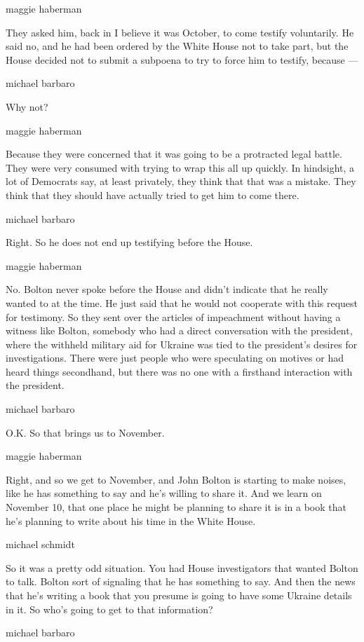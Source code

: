 maggie haberman

They asked him, back in I believe it was October, to come testify
voluntarily. He said no, and he had been ordered by the White House not
to take part, but the House decided not to submit a subpoena to try to
force him to testify, because ---

michael barbaro

Why not?

maggie haberman

Because they were concerned that it was going to be a protracted legal
battle. They were very consumed with trying to wrap this all up quickly.
In hindsight, a lot of Democrats say, at least privately, they think
that that was a mistake. They think that they should have actually tried
to get him to come there.

michael barbaro

Right. So he does not end up testifying before the House.

maggie haberman

No. Bolton never spoke before the House and didn't indicate that he
really wanted to at the time. He just said that he would not cooperate
with this request for testimony. So they sent over the articles of
impeachment without having a witness like Bolton, somebody who had a
direct conversation with the president, where the withheld military aid
for Ukraine was tied to the president's desires for investigations.
There were just people who were speculating on motives or had heard
things secondhand, but there was no one with a firsthand interaction
with the president.

michael barbaro

O.K. So that brings us to November.

maggie haberman

Right, and so we get to November, and John Bolton is starting to make
noises, like he has something to say and he's willing to share it. And
we learn on November 10, that one place he might be planning to share it
is in a book that he's planning to write about his time in the White
House.

michael schmidt

So it was a pretty odd situation. You had House investigators that
wanted Bolton to talk. Bolton sort of signaling that he has something to
say. And then the news that he's writing a book that you presume is
going to have some Ukraine details in it. So who's going to get to that
information?

michael barbaro


